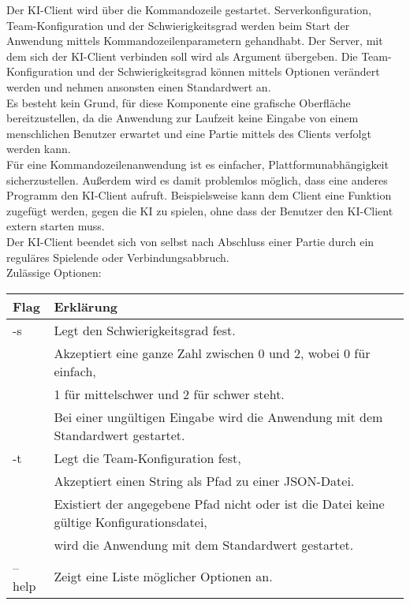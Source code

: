 Der KI-Client wird über die Kommandozeile gestartet. Serverkonfiguration, Team-Konfiguration und der Schwierigkeitsgrad werden beim Start der Anwendung mittels Kommandozeilenparametern gehandhabt. Der Server, mit dem sich der KI-Client verbinden soll wird als Argument übergeben. Die Team-Konfiguration und der Schwierigkeitsgrad können mittels Optionen verändert werden und nehmen ansonsten einen Standardwert an.\\
Es besteht kein Grund, für diese Komponente eine grafische Oberfläche bereitzustellen, da die Anwendung zur Laufzeit keine Eingabe von einem menschlichen Benutzer erwartet und eine Partie mittels des Clients verfolgt werden kann. \\
Für eine Kommandozeilenanwendung ist es einfacher, Plattformunabhängigkeit sicherzustellen. Außerdem wird es damit problemlos möglich, dass eine anderes Programm den KI-Client aufruft. Beispielsweise kann dem Client eine Funktion zugefügt werden, gegen die KI zu spielen, ohne dass der Benutzer den KI-Client extern starten muss.\\
Der KI-Client beendet sich von selbst nach Abschluss einer Partie durch ein reguläres Spielende oder Verbindungsabbruch.\\
Zulässige Optionen:\\
\begin{tabular}{| l | l |}
	\hline
	Flag & Erklärung \\\hline
	-s & Legt den Schwierigkeitsgrad fest.\\
	& Akzeptiert eine ganze Zahl zwischen 0 und 2, wobei 0 für einfach,\\
	& 1 für mittelschwer und 2 für schwer steht.\\
	& Bei einer ungültigen Eingabe wird die Anwendung mit dem Standardwert gestartet.\\\hline
	-t & Legt die Team-Konfiguration fest,\\
	& Akzeptiert einen String als Pfad zu einer JSON-Datei.\\
	& Existiert der angegebene Pfad nicht oder ist die Datei keine gültige Konfigurationsdatei,\\
	& wird die Anwendung mit dem Standardwert gestartet.\\\hline
	--help & Zeigt eine Liste möglicher Optionen an.\\\hline
\end{tabular}